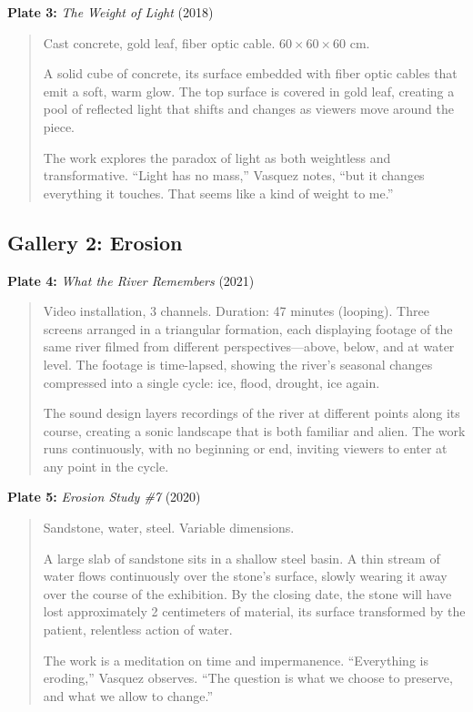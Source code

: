 \documentclass[
    language=english,
    doctype=art-catalogue,
    institution=none,
]{../../omnilatex}
\begin{document}
\textbf{Plate 3:} \textit{The Weight of Light} (2018)
\begin{quote}
Cast concrete, gold leaf, fiber optic cable.
$60 \times 60 \times 60$ cm.

A solid cube of concrete, its surface embedded with fiber optic cables that emit a soft, warm glow. The top surface is covered in gold leaf, creating a pool of reflected light that shifts and changes as viewers move around the piece.

The work explores the paradox of light as both weightless and transformative. ``Light has no mass,'' Vasquez notes, ``but it changes everything it touches. That seems like a kind of weight to me.''
\end{quote}

\subsection{Gallery 2: Erosion}

\textbf{Plate 4:} \textit{What the River Remembers} (2021)
\begin{quote}
Video installation, 3 channels. Duration: 47 minutes (looping).
Three screens arranged in a triangular formation, each displaying footage of the same river filmed from different perspectives---above, below, and at water level. The footage is time-lapsed, showing the river's seasonal changes compressed into a single cycle: ice, flood, drought, ice again.

The sound design layers recordings of the river at different points along its course, creating a sonic landscape that is both familiar and alien. The work runs continuously, with no beginning or end, inviting viewers to enter at any point in the cycle.
\end{quote}

\textbf{Plate 5:} \textit{Erosion Study \#7} (2020)
\begin{quote}
Sandstone, water, steel.
Variable dimensions.

A large slab of sandstone sits in a shallow steel basin. A thin stream of water flows continuously over the stone's surface, slowly wearing it away over the course of the exhibition. By the closing date, the stone will have lost approximately 2 centimeters of material, its surface transformed by the patient, relentless action of water.

The work is a meditation on time and impermanence. ``Everything is eroding,'' Vasquez observes. ``The question is what we choose to preserve, and what we allow to change.''
\end{quote}
\end{document}
